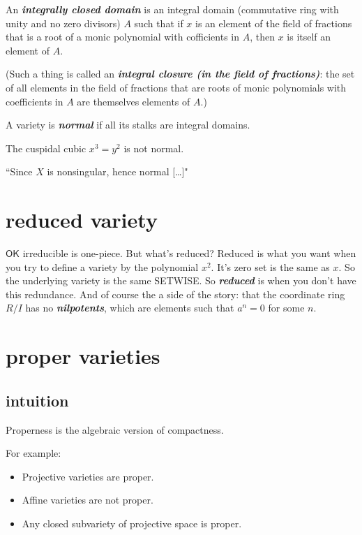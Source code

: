 An \textit{\textbf{integrally closed domain}} is an integral domain (commutative ring with unity and no zero divisors) \(A\) such that if \(x\) is an element of the field of fractions that is a root of a monic polynomial with cofficients in \(A\), then \(x\) is itself an element of \(A\).

(Such a thing is called an \textit{\textbf{integral closure (in the field of fractions)}}: the set of all elements in the field of fractions that are roots of monic polynomials with coefficients in \(A\) are themselves elements of \(A\).)

A variety is \textit{\textbf{normal}} if all its stalks are integral domains.

The cuspidal cubic \(x^3=y^2\) is not normal.

``Since \(X\) is nonsingular, hence normal […]"



\section{reduced variety}
\(\mathsf{OK}\) irreducible is one-piece. But what's reduced? Reduced is what you want when you try to define a variety by the polynomial \(x^2\). It's zero set is the same as \(x\). So the underlying variety is the same SETWISE. So \textit{\textbf{reduced}} is when you don't have this redundance. And of course the a side of the story: that the coordinate ring  \(R/I\) has no \textit{\textbf{nilpotents}}, which are elements such that \(a^n=0\) for some \(n\).

\section{proper varieties}
\subsection*{intuition}
Properness is the algebraic version of compactness.

For example:

\begin{itemize}
\item Projective varieties are proper.

\item Affine varieties are not proper.

\item Any closed subvariety of projective space is proper.
\end{itemize}

